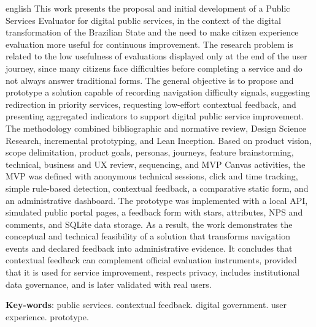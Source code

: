 \begin{resumo}[Abstract]
 \begin{otherlanguage*}{english}
This work presents the proposal and initial development of a Public Services
Evaluator for digital public services, in the context of the digital
transformation of the Brazilian State and the need to make citizen experience
evaluation more useful for continuous improvement. The research problem is
related to the low usefulness of evaluations displayed only at the end of the
user journey, since many citizens face difficulties before completing a service
and do not always answer traditional forms. The general objective is to propose
and prototype a solution capable of recording navigation difficulty signals,
suggesting redirection in priority services, requesting low-effort contextual
feedback, and presenting aggregated indicators to support digital public service
improvement. The methodology combined bibliographic and normative review, Design
Science Research, incremental prototyping, and Lean Inception. Based on product
vision, scope delimitation, product goals, personas, journeys, feature
brainstorming, technical, business and UX review, sequencing, and MVP Canvas
activities, the MVP was defined with anonymous technical sessions, click and time
tracking, simple rule-based detection, contextual feedback, a comparative static
form, and an administrative dashboard. The prototype was implemented with a local
API, simulated public portal pages, a feedback form with stars, attributes, NPS
and comments, and SQLite data storage. As a result, the work demonstrates the
conceptual and technical feasibility of a solution that transforms navigation
events and declared feedback into administrative evidence. It concludes that
contextual feedback can complement official evaluation instruments, provided that
it is used for service improvement, respects privacy, includes institutional data
governance, and is later validated with real users.

   \vspace{\onelineskip}

   \noindent
   \textbf{Key-words}: public services. contextual feedback. digital government.
   user experience. prototype.
 \end{otherlanguage*}
\end{resumo}
